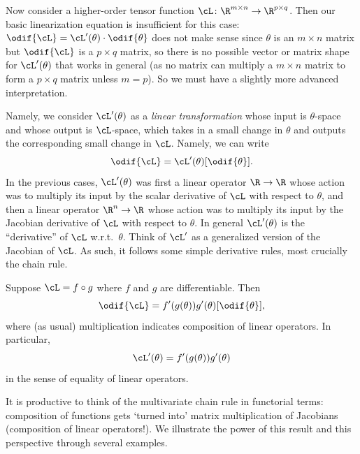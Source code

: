 \documentclass[../../book-main.tex]{subfiles}
\begin{document}
Now consider a higher-order tensor function \(\cL \colon \R^{m \times
n} \to \R^{p \times q}\). Then our basic linearization equation is
insufficient for this case: \(\odif{\cL} = \cL^{\prime}(\theta) \cdot
\odif{\theta}\) does not make sense since \(\theta\) is an \(m \times
n\) matrix but \(\odif{\cL}\) is a \(p \times q\) matrix, so there is
no possible vector or matrix shape for \(\cL^{\prime}(\theta)\) that
works in general (as no matrix can multiply a \(m \times n\) matrix
to form a \(p \times q\) matrix unless \(m = p\)). So we must have a
slightly more advanced interpretation.

Namely, we consider \(\cL^{\prime}(\theta)\) as a \textit{linear
transformation} whose input is \(\theta\)-space and whose output is
\(\cL\)-space, which takes in a small change in \(\theta\) and
outputs the corresponding small change in \(\cL\). Namely, we can write
\begin{equation}
    \odif{\cL} = \cL^{\prime}(\theta)[\odif{\theta}].
\end{equation}
In the previous cases, \(\cL^{\prime}(\theta)\) was first a linear
operator \(\R \to \R\) whose action was to multiply its input by the
scalar derivative of \(\cL\) with respect to \(\theta\), and then a
linear operator \(\R^{n} \to \R\) whose action was to multiply its
input by the Jacobian derivative of \(\cL\) with respect to
\(\theta\). In general \(\cL^{\prime}(\theta)\) is the ``derivative''
of \(\cL\) w.r.t.~\(\theta\).
Think of \(\cL^{\prime}\) as a generalized version of the Jacobian of \(\cL\).
As such, it follows some simple derivative rules, most crucially the chain rule.

\begin{theorem}
    Suppose \(\cL = f \circ g\) where \(f\) and \(g\) are differentiable. Then
    \begin{equation}
        \odif{\cL} = f^{\prime}(g(\theta))g^{\prime}(\theta)[\odif{\theta}],
    \end{equation}
    where (as usual) multiplication indicates composition of linear
    operators. In particular,
    \begin{equation}
        \cL^{\prime}(\theta) = f^{\prime}(g(\theta))g^{\prime}(\theta)
    \end{equation}
    in the sense of equality of linear operators.
\end{theorem}

It is productive to think of the multivariate chain rule in functorial terms:
composition of functions gets `turned into' matrix multiplication of Jacobians
(composition of linear operators!).
We illustrate the power of this result and this perspective through several
examples.
\end{document}
